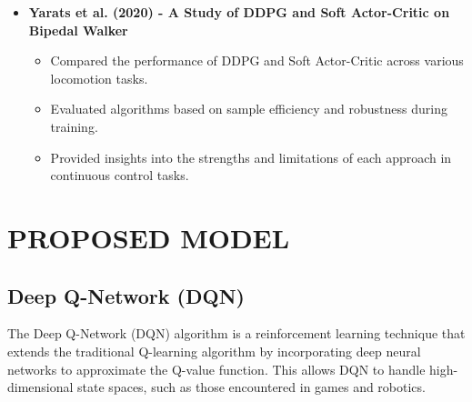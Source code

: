 \documentclass[letterpaper]{article}
\begin{document}
\begin{itemize}
    \item \textbf{Yarats et al. (2020) - A Study of DDPG and Soft Actor-Critic on Bipedal Walker}
    \begin{itemize}
        \item Compared the performance of DDPG and Soft Actor-Critic across various locomotion tasks.
        \item Evaluated algorithms based on sample efficiency and robustness during training.
        \item Provided insights into the strengths and limitations of each approach in continuous control tasks.
    \end{itemize}
\end{itemize}




\vspace{1em}
\section{PROPOSED MODEL}
\vspace{1em}


\subsection{Deep Q-Network (DQN)}

The Deep Q-Network (DQN) algorithm is a reinforcement learning technique that extends the traditional Q-learning algorithm by incorporating deep neural networks to approximate the Q-value function. This allows DQN to handle high-dimensional state spaces, such as those encountered in games and robotics.
\end{document}

